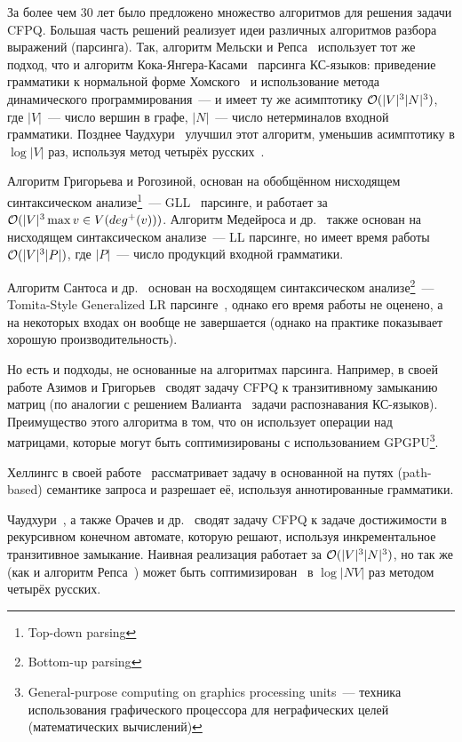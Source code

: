 За более чем 30 лет было предложено множество алгоритмов для решения задачи CFPQ.
Большая часть решений реализует идеи различных алгоритмов разбора выражений (парсинга). Так, алгоритм Мельски и Репса~\cite{Reps97} использует тот же подход, что и алгоритм Кока-Янгера-Касами~\cite{Younger1967} парсинга КС-языков: приведение грамматики к нормальной форме Хомского~\cite{Chomsky1957} и использование метода динамического программирования~--- и имеет ту же асимптотику $\mathcal{O}(|V|^3 |N|^3)$, где $|V|$~--- число вершин в графе, $|N|$~--- число нетерминалов входной грамматики. Позднее Чаудхури~\cite{Chaudhuri06} улучшил этот алгоритм, уменьшив асимптотику в $\log |V|$ раз, используя метод четырёх русских~\cite{Arlazarov70}.

Алгоритм Григорьева и Рогозиной, основан на обобщённом нисходящем синтаксическом анализе\footnote{Top-down parsing}~--- GLL~\cite{Scott10} парсинге, и работает за $\mathcal{O}(|V|^3 \max\limits{v \in V} (deg^{+}(v)))$. Алгоритм Медейроса и др.~\cite{Medeiros18} также основан на нисходящем синтаксическом анализе~--- LL парсинге, но имеет время работы $\mathcal{O}(|V|^3 |P|)$, где $|P|$~--- число продукций входной грамматики.

Алгоритм Сантоса и др.~\cite{Santos18} основан на восходящем синтаксическом анализе\footnote{Bottom-up parsing}~--- Tomita-Style Generalized LR парсинге~\cite{Scott00}, однако его время работы не оценено, а на некоторых входах он вообще не завершается (однако на практике показывает хорошую производительность). 

Но есть и подходы, не основанные на алгоритмах парсинга. 
Например, в своей работе Азимов и Григорьев~\cite{Santos18} сводят задачу CFPQ к транзитивному замыканию матриц (по аналогии с решением Валианта~\cite{Valiant1975} задачи распознавания КС-языков). Преимущество этого алгоритма в том, что он использует операции над матрицами, которые могут быть соптимизированы с использованием GPGPU\footnote{General-purpose computing on graphics processing units~--- техника использования графического процессора для неграфических целей (математических вычислений)}.

Хеллингс в своей работе~\cite{Hellings15} рассматривает задачу в основанной на путях (path-based) семантике запроса и разрешает её, используя аннотированные грамматики.

Чаудхури~\cite{Chaudhuri08}, а также Орачев и др.~\cite{Orachev20} сводят задачу CFPQ к задаче достижимости в рекурсивном конечном автомате, которую решают, используя инкрементальное транзитивное замыкание. Наивная реализация работает за $\mathcal{O}(|V|^3 |N|^3)$, но так же (как и алгоритм Репса~\cite{Reps97,Chaudhuri06}) может быть соптимизирован~\cite{Shemetova21} в $\log |NV|$ раз методом четырёх русских.

